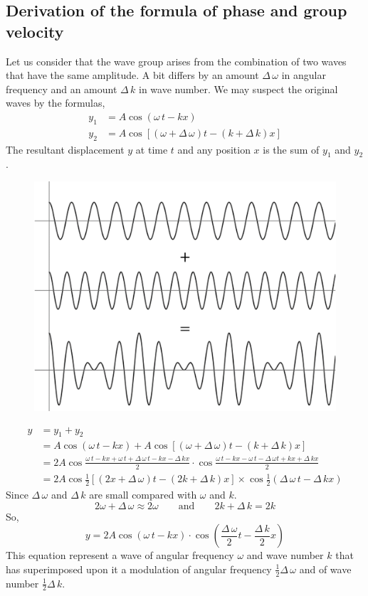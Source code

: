 \documentclass[../main.tex]{subfiles}
\begin{document}
\subsection{Derivation of the formula of phase and group velocity}
Let us consider that the wave group arises from the combination of two waves that have the same amplitude. A bit differs by an amount $ \Delta\, \omega $ in angular frequency and an amount $ \Delta\, k $ in wave number. We may suspect the original waves by the formulas,
\begin{align*}
    y_1&=A\cos(\omega\,t-kx)\\
    y_2&=A\cos\left[ (\omega+\Delta\, \omega)t-(k+\Delta\, k)x \right]
\end{align*}
The resultant displacement $ y $ at time $ t $ and any position $ x $ is the sum of $ y_1 $ and $ y_2 $.
\begin{figure}[ht]
    \centering
    \includegraphics[scale=.5]{de-Broglie-wave-derivation.png}
\end{figure}
\begin{align*}
    y&=y_1+y_2\\
    &=A\cos(\omega \,t-kx)+A\cos\left[ (\omega+\Delta\, \omega)t-(k+\Delta\, k)x \right]\\
    &=2A\cos\frac{\omega\,t-kx+\omega\,t+\Delta\, \omega\, t-kx-\Delta\, kx}{2}\cdot \cos\frac{\omega\,t-kx-\omega\,t-\Delta\, \omega t+kx+\Delta\, kx}{2}\\
    &=2A\cos\frac{1}{2}\left[ (2x+\Delta\, \omega)t-(2k+\Delta\, k)x \right]\times \cos\frac{1}{2}\left( \Delta\, \omega\,t-\Delta\, kx \right)
\end{align*}
Since $ \Delta\, \omega $ and $ \Delta\, k $ are small compared with $ \omega $ and $ k $.
\[
    2\omega+\Delta\, \omega\approx 2\omega\qquad \text{and}\qquad 2k+\Delta\, k=2k
\]
So,
\[
    y=2A \cos\left( \omega\,t-kx \right)\cdot\cos\left( \frac{\Delta\, \omega}{2}t-\frac{\Delta\, k}{2}x \right)
\]
This equation represent a wave of angular frequency $ \omega $ and wave number $ k $ that has superimposed upon it a modulation of angular frequency $ \frac{1}{2}\Delta\, \omega $ and of wave number $ \frac{1}{2}\Delta\, k $.
\end{document}
